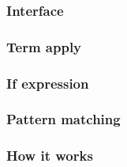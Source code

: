 \documentclass[xcolor=dvipsnames]{beamer}
\theoremstyle{definition}
\begin{document}

\begin{frame}[fragile]
    \frametitle{Interface}
    \begin{block}{}
        
        
    \end{block}
\end{frame}

\begin{frame}[fragile]
    \frametitle{Term apply}
    \begin{block}{}
        
    \end{block}
\end{frame}

\begin{frame}[fragile]
    \frametitle{If expression}
    \begin{block}{}
        
    \end{block}
\end{frame}

\begin{frame}[fragile]
    \frametitle{Pattern matching}
    \begin{block}{}
        
    \end{block}
\end{frame}

\begin{frame}[fragile]
    \frametitle{How it works}
    \begin{block}{}
        
    \end{block}
\end{frame}


%
%

\end{document}
